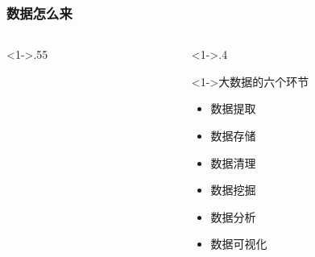 \documentclass[10pt,aspectratio=43,mathserif,table]{beamer}
\begin{document}
\begin{frame}
	\frametitle{数据怎么来}
	\begin{columns}[c]
		\raggedright
		\begin{column}<1->{.55\textwidth}
			\begin{figure}[thpb]
				\centering
				\label{fig:campus}
			\end{figure}
		\end{column}
		\hfill
		\begin{column}<1->{.4\textwidth}
			\begin{block}<1->{大数据的六个环节}
			\begin{itemize}
				\item<1-> 数据提取
				\item<1-> 数据存储
				\item<1-> 数据清理
				\item<1-> 数据挖掘
				\item<1-> 数据分析
				\item<1-> 数据可视化
			\end{itemize}
		\end{block}
		\end{column}
	\end{columns}
	

\end{frame}
\end{document}
